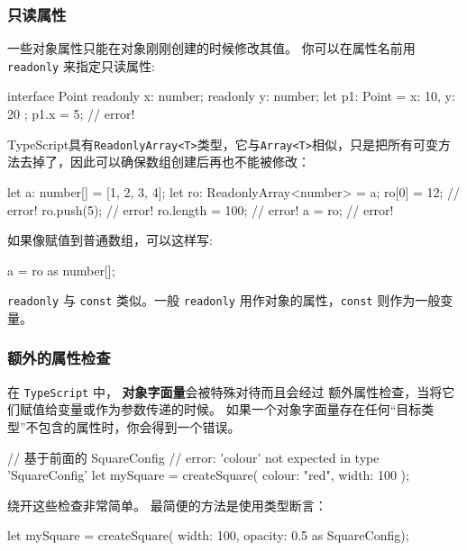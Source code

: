 \subsubsection*{只读属性}

一些对象属性只能在对象刚刚创建的时候修改其值。 你可以在属性名前用 \texttt{readonly} 来指定只读属性:

\begin{TypeScript}
interface Point {
    readonly x: number;
    readonly y: number;
}
let p1: Point = { x: 10, y: 20 };
p1.x = 5; // error!
\end{TypeScript}

TypeScript具有\texttt{ReadonlyArray<T>}类型，它与\texttt{Array<T>}相似，只是把所有可变方法去掉了，因此可以确保数组创建后再也不能被修改：

\begin{TypeScript}
let a: number[] = [1, 2, 3, 4];
let ro: ReadonlyArray<number> = a;
ro[0] = 12; // error!
ro.push(5); // error!
ro.length = 100; // error!
a = ro; // error!
\end{TypeScript}

如果像赋值到普通数组，可以这样写:

\begin{TypeScript}
a = ro as number[];
\end{TypeScript}

\texttt{readonly} 与 \texttt{const} 类似。一般 \texttt{readonly} 用作对象的属性，\texttt{const} 则作为一般变量。

\subsubsection*{额外的属性检查}

在 \texttt{TypeScript} 中， \textbf{对象字面量}会被特殊对待而且会经过 额外属性检查，当将它们赋值给变量或作为参数传递的时候。 如果一个对象字面量存在任何“目标类型”不包含的属性时，你会得到一个错误。

\begin{TypeScript}
// 基于前面的 SquareConfig
// error: 'colour' not expected in type 'SquareConfig'
let mySquare = createSquare({ colour: "red", width: 100 });
\end{TypeScript}

绕开这些检查非常简单。 最简便的方法是使用类型断言：

\begin{TypeScript}
let mySquare = createSquare({ width: 100, opacity: 0.5 } as SquareConfig);
\end{TypeScript}

